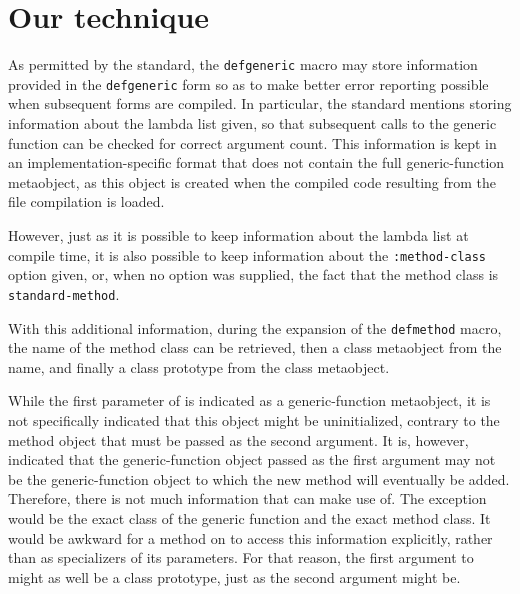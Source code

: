 \section{Our technique}

As permitted by the \commonlisp{} standard, the \texttt{defgeneric}
macro may store information provided in the \texttt{defgeneric} form
so as to make better error reporting possible when subsequent forms
are compiled.  In particular, the standard mentions storing
information about the lambda list given, so that subsequent calls to
the generic function can be checked for correct argument count.
This information is kept in an implementation-specific format that
does not contain the full generic-function metaobject, as this object
is created when the compiled code resulting from the file compilation
is loaded.

However, just as it is possible to keep information about the lambda
list at compile time, it is also possible to keep information about
the \texttt{:method-class} option given, or, when no option was
supplied, the fact that the method class is \texttt{standard-method}.

With this additional information, during the expansion of the
\texttt{defmethod} macro, the name of the method class can be
retrieved, then a class metaobject from the name, and finally a class
prototype from the class metaobject. 

While the first parameter of \mml{} is indicated as a generic-function
metaobject, it is not specifically indicated that this object might be
uninitialized, contrary to the method object that must be passed as
the second argument.  It is, however, indicated that the
generic-function object passed as the first argument may not be the
generic-function object to which the new method will eventually be
added.  Therefore, there is not much information that \mml{} can make
use of.  The exception would be the exact class of the generic
function and the exact method class.  It would be awkward for a method
on \mml{} to access this information explicitly, rather than as
specializers of its parameters.  For that reason, the first argument
to \mml{} might as well be a class prototype, just as the second
argument might be.
